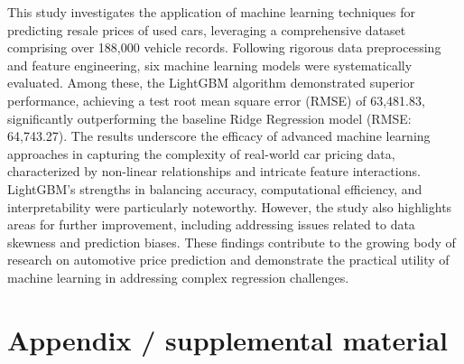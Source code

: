 \documentclass{article}
\begin{document}
This study investigates the application of machine learning techniques for predicting resale prices of used cars, leveraging a comprehensive dataset comprising over 188,000 vehicle records. Following rigorous data preprocessing and feature engineering, six machine learning models were systematically evaluated. Among these, the LightGBM algorithm demonstrated superior performance, achieving a test root mean square error (RMSE) of 63,481.83, significantly outperforming the baseline Ridge Regression model (RMSE: 64,743.27). The results underscore the efficacy of advanced machine learning approaches in capturing the complexity of real-world car pricing data, characterized by non-linear relationships and intricate feature interactions. LightGBM's strengths in balancing accuracy, computational efficiency, and interpretability were particularly noteworthy. However, the study also highlights areas for further improvement, including addressing issues related to data skewness and prediction biases. These findings contribute to the growing body of research on automotive price prediction and demonstrate the practical utility of machine learning in addressing complex regression challenges.




\newpage

\appendix

\section{Appendix / supplemental material}
\end{document}
